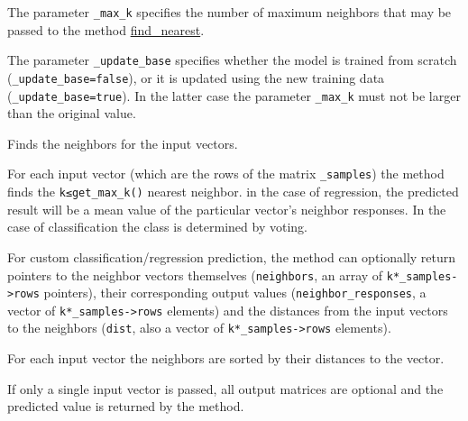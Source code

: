 The parameter \texttt{\_max\_k} specifies the number of maximum neighbors that may be passed to the method \href{#CvKNearest.3A.3Afindnearest}{find\_nearest}.

The parameter \texttt{\_update\_base} specifies whether the model is trained from scratch \newline (\texttt{\_update\_base=false}), or it is updated using the new training data (\texttt{\_update\_base=true}). In the latter case the parameter \texttt{\_max\_k} must not be larger than the original value.



Finds the neighbors for the input vectors.


For each input vector (which are the rows of the matrix \texttt{\_samples}) the method finds the \texttt{k≤get\_max\_k()} nearest neighbor. in the case of regression, the predicted result will be a mean value of the particular vector's neighbor responses. In the case of classification the class is determined by voting.

For custom classification/regression prediction, the method can optionally return pointers to the neighbor vectors themselves (\texttt{neighbors}, an array of \texttt{k*\_samples->rows} pointers), their corresponding output values (\texttt{neighbor\_responses}, a vector of \texttt{k*\_samples->rows} elements) and the distances from the input vectors to the neighbors (\texttt{dist}, also a vector of \texttt{k*\_samples->rows} elements).

For each input vector the neighbors are sorted by their distances to the vector.

If only a single input vector is passed, all output matrices are optional and the predicted value is returned by the method.



